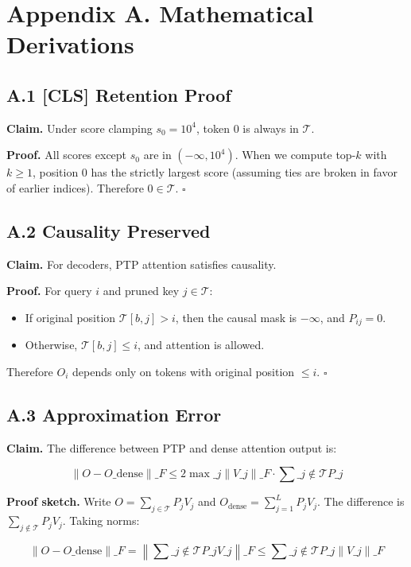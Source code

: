 
\section{Appendix A. Mathematical Derivations}

\subsection{A.1 [CLS] Retention Proof}

\textbf{Claim.} Under score clamping $s_0 = 10^4$, token 0 is always in 
$\mathcal{T}$.

\textbf{Proof.} All scores except $s_0$ are in $(-\infty, 10^4)$. When we 
compute top-$k$ with $k \geq 1$, position 0 has the strictly largest 
score (assuming ties are broken in favor of earlier indices). Therefore 
$0 \in \mathcal{T}$. $\square$

\subsection{A.2 Causality Preserved}

\textbf{Claim.} For decoders, PTP attention satisfies causality.

\textbf{Proof.} For query $i$ and pruned key $j \in \mathcal{T}$:
\begin{itemize}
\item If original position $\mathcal{T}[b, j] > i$, then the causal mask is
  $-\infty$, and $P_{ij} = 0$.
\item Otherwise, $\mathcal{T}[b, j] \leq i$, and attention is allowed.

\end{itemize}
Therefore $O_i$ depends only on tokens with original position $\leq i$. 
$\square$

\subsection{A.3 Approximation Error}

\textbf{Claim.} The difference between PTP and dense attention output is:

\[
\|O - O\_\text{dense}\|\_F \leq 2 \max\_j \|V\_j\|\_F \cdot \sum\_{j \notin \mathcal{T}} P\_j
\tag{A.1}
\]

\textbf{Proof sketch.} Write $O = \sum_{j \in \mathcal{T}} P_j V_j$ and 
$O_\text{dense} = \sum_{j=1}^L P_j V_j$. The difference is 
$\sum_{j \notin \mathcal{T}} P_j V_j$. Taking norms:

\[
\|O - O\_\text{dense}\|\_F = \left\|\sum\_{j \notin \mathcal{T}} P\_j V\_j\right\|\_F \leq \sum\_{j \notin \mathcal{T}} P\_j \|V\_j\|\_F
\]

